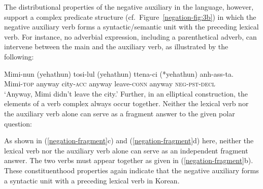 \documentclass[output=paper
                ,modfonts
                ,nonflat
	        ,collection
	        ,collectionchapter
	        ,collectiontoclongg
 	        ,biblatex
                ,babelshorthands
                ,newtxmath
                ,draftmode
                ,colorlinks, citecolor=brown
]{./langsci/langscibook}
\begin{document}
{\begin{exe}
\begin{xlist}
\begin{exe}
\begin{xlist}
The distributional properties of the negative auxiliary in the language, however, support
 a complex predicate structure (cf.\ Figure~\ref{negation-fig:3b}) in which the negative auxiliary verb
forms a syntactic/semantic unit with the preceding lexical verb.
For instance, no adverbial expression, including
a parenthetical adverb, can intervene between
the main and the auxiliary verb, as illustrated by the
following:

\ea
\gll Mimi-nun          (yehathun)           tosi-lul          (yehathun)           ttena-ci            (*yehathun) anh-ass-ta. \\
     Mimi-\textsc{top} anyway city-\textsc{acc} anyway leave-\textsc{conn} anyway \textsc{neg}-\textsc{pst}-\textsc{decl} \\
\glt `Anyway, Mimi didn't leave the city.'
\z
%
Further, in an elliptical construction, the elements of a verb complex
 always occur together. Neither the lexical  verb nor the auxiliary verb alone can serve
as a fragment answer to the given polar question:

\eal
\label{negation-fragment}
\zl

%
%
%
%
As shown in (\ref{negation-fragment}c) and (\ref{negation-fragment}d) here, neither the lexical verb nor the auxiliary verb alone can serve as an independent fragment answer. The two
verbs must appear together as given in (\ref{negation-fragment}b). These constituenthood
properties again indicate that the negative auxiliary forms
a syntactic unit with a preceding lexical  verb in Korean.


\end{xlist}
\end{exe}
\end{xlist}
\end{exe}}
\end{document}
